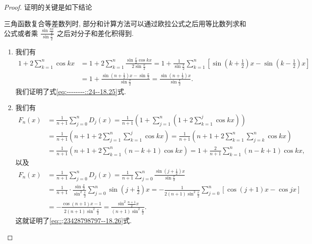 \documentclass[../../main.tex]{subfiles}%
\begin{document}
\begin{proof}

证明的关键是如下结论
\begin{conclusion}
三角函数复合等差数列时, 部分和计算方法可以通过欧拉公式之后用等比数列求和公式或者乘 $\frac{\sin \frac{nx}{2}}{\sin \frac{x}{2}}$ 之后对分子和差化积得到.
\end{conclusion}
\begin{enumerate}
\item 我们有
\begin{align*}
1 + 2\sum_{k = 1}^{n} \cos kx &= 1 + 2\sum_{k = 1}^{n} \frac{\sin \frac{x}{2} \cos kx}{2\sin \frac{x}{2}} = 1 + \frac{1}{\sin \frac{x}{2}} \sum_{k = 1}^{n} [\sin\left(k + \frac{1}{2}\right)x - \sin\left(k - \frac{1}{2}\right)x] \\
&= 1 + \frac{\sin\left(n + \frac{1}{2}\right)x - \sin \frac{x}{2}}{\sin \frac{x}{2}} = \frac{\sin\left(n + \frac{1}{2}\right)x}{\sin \frac{x}{2}}.
\end{align*}
我们证明了式\eqref{eq:--------::24--18.25}式.

\item 我们有
\begin{align*}
F_n(x) &= \frac{1}{n + 1}\sum_{j = 0}^{n} D_j(x) = \frac{1}{n + 1} \left( 1 + \sum_{j = 1}^{n} \left(1 + 2\sum_{k = 1}^{j} \cos kx \right) \right) \\
&= \frac{1}{n + 1} \left( n + 1 + 2\sum_{j = 1}^{n} \sum_{k = 1}^{j} \cos kx \right) = \frac{1}{n + 1} \left( n + 1 + 2\sum_{k = 1}^{n} \sum_{j = k}^{n} \cos kx \right) \\
&= \frac{1}{n + 1} \left( n + 1 + 2\sum_{k = 1}^{n} (n - k + 1)\cos kx \right) = 1 + \frac{2}{n + 1}\sum_{k = 1}^{n} (n - k + 1)\cos kx,
\end{align*}
以及
\begin{align*}
F_n(x) &= \frac{1}{n + 1}\sum_{j = 0}^{n} D_j(x) = \frac{1}{n + 1}\sum_{j = 0}^{n} \frac{\sin\left(j + \frac{1}{2}\right)x}{\sin \frac{x}{2}} \\
&= \frac{1}{n + 1} \cdot \frac{\sin \frac{x}{2}}{\sin^2 \frac{x}{2}} \sum_{j = 0}^{n} \sin\left(j + \frac{1}{2}\right)x = -\frac{1}{2(n + 1)\sin^2 \frac{x}{2}} \sum_{j = 0}^{n} [\cos(j + 1)x - \cos jx] \\
&= -\frac{\cos(n + 1)x - 1}{2(n + 1)\sin^2 \frac{x}{2}} = \frac{\sin^2 \frac{n + 1}{2}x}{(n + 1)\sin^2 \frac{x}{2}}.
\end{align*}
这就证明了\eqref{eq::;23428798797--18.26}式.
\end{enumerate}

\end{proof}
\end{document}
